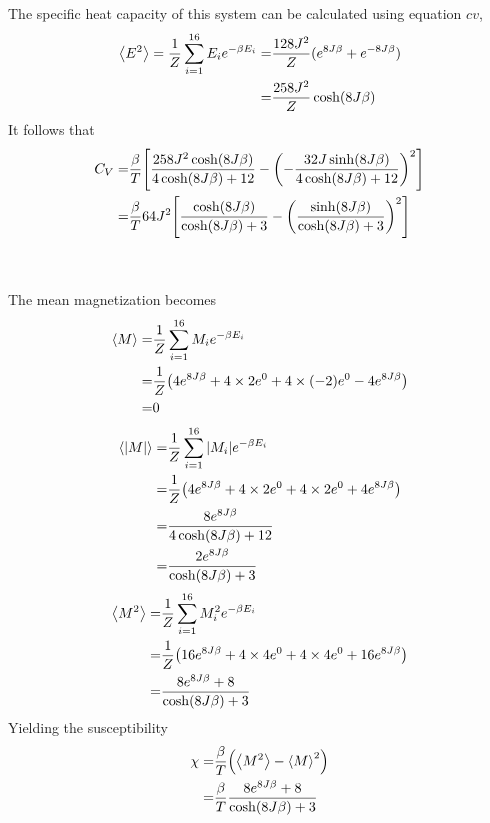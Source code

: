 \documentclass[%
reprint,nofootinbib,
amsmath,amssymb,
aps,
]{revtex4-1}
\begin{document}
The specific heat capacity of this system can be calculated using equation $cv$, 
\begin{align}
\expval{E^2} = \dfrac{1}{Z}\sum_{i=1}^{16}E_ie^{-\beta E_i}  = & \dfrac{128J^2}{Z}(e^{8J\beta} + e^{-8J\beta}) \\
=& \dfrac{258J^2}{Z}\cosh(8J\beta)
\end{align}
It follows that 
\begin{align}
C_V =& \dfrac{\beta}{T}\qty[\dfrac{258J^2\cosh(8J\beta)}{4\cosh(8J\beta) + 12 }  -\qty(-\dfrac{32J\sinh(8J\beta)}{4\cosh(8J\beta) + 12 })^2] \nonumber \\
= & \dfrac{\beta}{T}64J^2\qty[\dfrac{\cosh(8J\beta)}{\cosh(8J\beta) + 3}  -\qty(\dfrac{\sinh(8J\beta)}{\cosh(8J\beta) + 3 })^2]\nonumber \\ \nonumber & \\ & 
\end{align}
The mean magnetization becomes 
\begin{align*}
\expval{M} =& \dfrac{1}{Z}\sum_{i = 1}^{16} M_ie^{-\beta E_i} \\ 
= & \dfrac{1}{Z}\qty(4e^{8J\beta} +4\times 2e^0 + 4\times(-2)e^0 -4e^{8J\beta}) \\
= & 0
\end{align*}
\begin{align*}
\expval{\abs{M}} =& \dfrac{1}{Z}\sum_{i = 1}^{16} \abs{M_i}e^{-\beta E_i} \\ 
= & \dfrac{1}{Z}\qty(4e^{8J\beta} +4\times 2e^0 + 4\times2e^0 +4e^{8J\beta}) \\
= & \dfrac{8e^{8J\beta}}{4\cosh(8J\beta) + 12 } \\
= & \dfrac{2e^{8J\beta}}{\cosh(8J\beta) + 3 }
\end{align*}
\begin{align*}
\expval{M^2} =& \dfrac{1}{Z}\sum_{i = 1}^{16} M_i^2e^{-\beta E_i} \\ 
= & \dfrac{1}{Z}\qty(16e^{8J\beta} +4\times 4e^0 + 4\times4e^0 + 16e^{8J\beta}) \\
= & \dfrac{8e^{8J\beta} + 8}{\cosh(8J\beta) + 3}
\end{align*}
Yielding the susceptibility 
\begin{align}
\chi =& \dfrac{\beta}{T}\qty(\expval{M^2}- \expval{M}^2)\\
=& \dfrac{\beta}{T}\dfrac{8e^{8J\beta} + 8}{\cosh(8J\beta) + 3}
\end{align}

 
\end{document}
